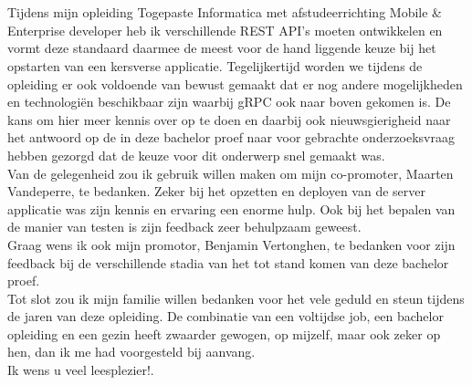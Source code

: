 
\chapter*{}%
\label{ch:voorwoord}

Tijdens mijn opleiding Togepaste Informatica met afstudeerrichting Mobile \& Enterprise developer heb ik verschillende REST API's moeten ontwikkelen
en vormt deze standaard daarmee de meest voor de hand liggende keuze bij het opstarten van een kersverse applicatie. Tegelijkertijd worden we tijdens
de opleiding er ook voldoende van bewust gemaakt dat er nog andere mogelijkheden en technologiën beschikbaar zijn waarbij gRPC ook naar boven gekomen is.
De kans om hier meer kennis over op te doen en daarbij ook nieuwsgierigheid naar het antwoord op de in deze bachelor proef naar voor gebrachte onderzoeksvraag
hebben gezorgd dat de keuze voor dit onderwerp snel gemaakt was.\\

Van de gelegenheid zou ik gebruik willen maken om mijn co-promoter, Maarten Vandeperre, te bedanken. Zeker bij het opzetten en deployen van de server applicatie was
zijn kennis en ervaring een enorme hulp. Ook bij het bepalen van de manier van testen is zijn feedback zeer behulpzaam geweest.\\

Graag wens ik ook mijn promotor, Benjamin Vertonghen, te bedanken voor zijn feedback bij de verschillende stadia van het tot stand komen van deze bachelor proef.\\

Tot slot zou ik mijn familie willen bedanken voor het vele geduld en steun tijdens de jaren van deze opleiding. De combinatie van een voltijdse job, een bachelor opleiding en
een gezin heeft zwaarder gewogen, op mijzelf, maar ook zeker op hen, dan ik me had voorgesteld bij aanvang.\\

Ik wens u veel leesplezier!.